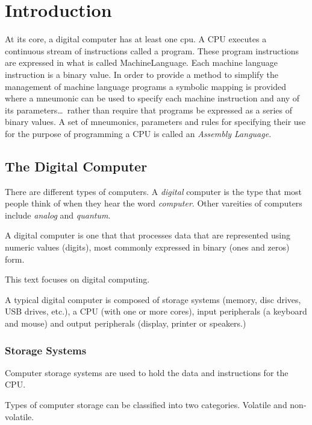 \chapter{Introduction}
\label{chapter:Introduction}

At its core, a digital computer has at least one \acrfull{cpu}.  A
CPU executes a continuous stream of instructions called a \gls{program}.  
These program instructions are expressed in what is called 
\gls{MachineLanguage}.  Each machine language instruction is a binary value.  
In order to provide a method to simplify the management of machine language 
programs a symbolic mapping is provided where a \gls{mneumonic} can be used to 
specify each machine instruction and any of its parameters\ldots\ rather 
than require that programs be expressed as a series of binary values.  
A set of mneumonics, parameters and rules for specifying their use for
the purpose of programming a CPU is called an {\em Assembly Language}.

\section{The Digital Computer}

There are different types of computers.  A {\em digital} computer is
the type that most people think of when they hear the word {\em computer}.
Other vareities of computers include {\em analog} and {\em quantum}.

A digital computer is one that that processes data that are represented
using numeric values (digits), most commonly expressed in binary
(ones and zeros) form.

This text focuses on digital computing.

A typical digital computer is composed of storage systems (memory, disc 
drives, USB drives, etc.), a CPU (with one or more cores), input peripherals 
(a keyboard and mouse) and output peripherals (display, printer or speakers.)

\subsection{Storage Systems}

Computer storage systems are used to hold the data and instructions
for the CPU.

Types of computer storage can be classified into two categories.
Volatile and non-volatile.

